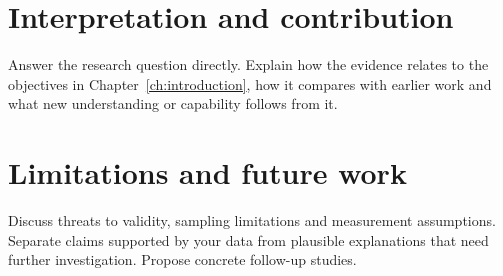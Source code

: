 \section{Interpretation and contribution}
Answer the research question directly. Explain how the evidence relates to the
objectives in Chapter~\ref{ch:introduction}, how it compares with earlier work
and what new understanding or capability follows from it.
\section{Limitations and future work}
Discuss threats to validity, sampling limitations and measurement assumptions.
Separate claims supported by your data from plausible explanations that need
further investigation. Propose concrete follow-up studies.
